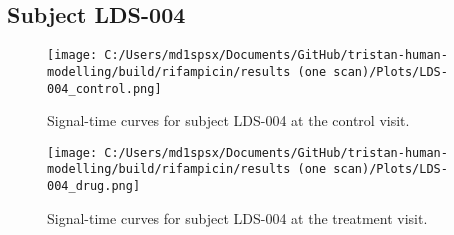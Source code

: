 \documentclass{epflreport}%
\begin{document}
\subsection{Subject LDS{-}004}%
\label{subsec:SubjectLDS{-}004}%

%


\begin{figure}[h!]%
\centering%
\texttt{[image: C:/Users/md1spsx/Documents/GitHub/tristan-human-modelling/build/rifampicin/results (one scan)/Plots/LDS-004\_control.png]}%
\caption{Signal{-}time curves for subject LDS{-}004 at the control visit.}%
\end{figure}

%


\begin{figure}[h!]%
\centering%
\texttt{[image: C:/Users/md1spsx/Documents/GitHub/tristan-human-modelling/build/rifampicin/results (one scan)/Plots/LDS-004\_drug.png]}%
\caption{Signal{-}time curves for subject LDS{-}004 at the treatment visit.}%
\end{figure}
\end{document}

